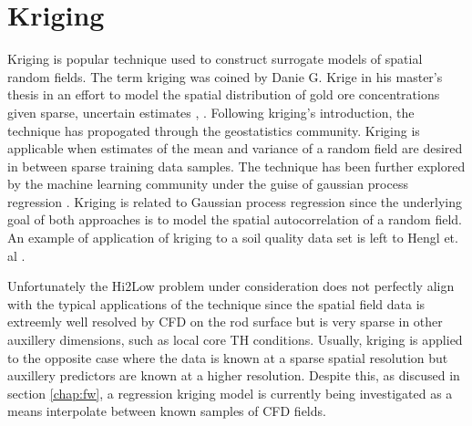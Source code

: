 \section{Kriging}

Kriging is popular technique used to construct surrogate models of spatial random fields.
The term kriging was coined by Danie G. Krige in his master's thesis in an effort to model the spatial distribution of gold ore concentrations given sparse, uncertain estimates \cite{krige51}, \cite{Krige51a}. Following kriging's introduction, the technique has propogated through the geostatistics community.  Kriging is applicable when estimates of the mean and variance of a random field are desired in between sparse training data samples.  The technique has been further explored by the machine learning community under the guise of gaussian process regression \cite{Williams96}.  Kriging is related to Gaussian process regression since the underlying goal of both approaches is to model the spatial autocorrelation of a random field.  An example of application of kriging to a soil quality data set is left to Hengl et. al \cite{Hengl07}.

Unfortunately the Hi2Low problem under consideration does not perfectly align with the typical applications of the technique since the spatial field data is extreemly well resolved by CFD on the rod surface but is very sparse in other auxillery dimensions, such as local core TH conditions.  Usually, kriging is applied to the opposite case where the data is known at a sparse spatial resolution but auxillery predictors are known at a higher resolution.  Despite this, as discused in section \ref{chap:fw}, a regression kriging model is currently being investigated as a means interpolate between known samples of CFD fields.

